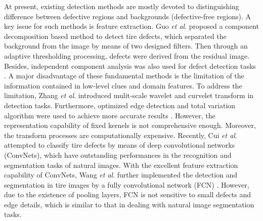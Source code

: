 \documentclass{article}
\begin{document}
At present, existing detection methods are mostly devoted to distinguishing difference between defective regions and backgrounds (defective-free regions). A key issue for such methods is feature extraction. Guo {\it et al}. \cite{guo2012tire} proposed a component decomposition based method to detect tire defects, which separated the background from the image by means of two designed filters. Then through an adaptive thresholding processing, defects were derived from the residual image. Besides, independent component analysis was also used for defect detection tasks \cite{cui2016defect,cui2016novel}. A major disadvantage of these fundamental methods is the limitation of the information contained in low-level clues and domain features. To address the limitation, Zhang {\it et al}. \cite{zhang2013defect,zhang2015automatic} introduced mulit-scale wavelet and curvelet transform in detection tasks. Furthermore, optimized edge detection and total variation algorithm were used to achieve more accurate results \cite{yan2013detection}. However, the representation capability of fixed kernels is not comprehensive enough. Moreover, the transform processes are computationally expensive. Recently, Cui {\it et al}. \cite{cui2018tire} attempted to classify tire defects by means of deep convolutional networks (ConvNets), which have outstanding performances in the recognition and segmentation tasks of natural images. With the excellent feature extraction capability of ConvNets, Wang {\it et al}. \cite{wang2019tire} further implemented the detection and segmentation in tire images by a fully convolutional network (FCN) \cite{long2015fully}. However, due to the existence of pooling layers, FCN is not sensitive to small defects and edge details, which is similar to that in dealing with natural image segmentation tasks.
\end{document}
